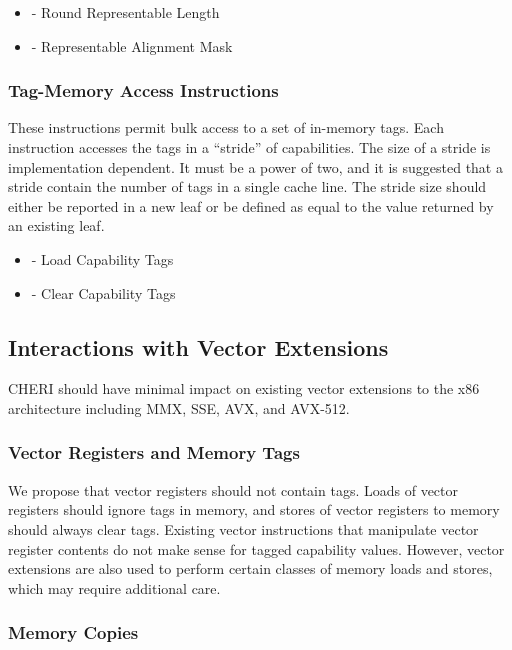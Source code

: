 \begin{itemize}
  \item {} - Round Representable Length
  \item {} - Representable Alignment Mask
\end{itemize}

\subsubsection{Tag-Memory Access Instructions}

These instructions permit bulk access to a set of in-memory tags.
Each instruction accesses the tags in a ``stride'' of capabilities.
The size of a stride is implementation dependent.  It must be a power
of two, and it is suggested that a stride contain the number of tags
in a single cache line.  The stride size should either be reported in
a new  leaf or be defined as equal to the value
returned by an existing  leaf.

\begin{itemize}
  \item {} - Load Capability Tags
  \item {} - Clear Capability Tags
\end{itemize}

\subsection{Interactions with Vector Extensions}

CHERI should have minimal impact on existing vector extensions to the
x86 architecture including MMX, SSE, AVX, and AVX-512.

\subsubsection{Vector Registers and Memory Tags}

We propose that vector registers should not contain tags.  Loads of
vector registers should ignore tags in memory, and stores of vector
registers to memory should always clear tags.  Existing vector
instructions that manipulate vector register contents do not make
sense for tagged capability values.  However, vector extensions are
also used to perform certain classes of memory loads and stores, which
may require additional care.

\subsubsection{Memory Copies}


